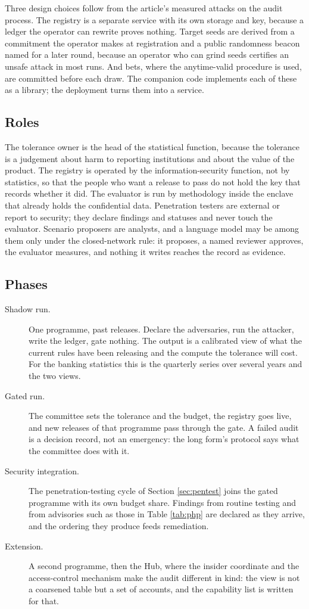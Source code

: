 \documentclass[11pt,a4paper]{article}
\begin{document}
Three design choices follow from the article's measured attacks on the audit process. The registry is a separate service with its own storage and key, because a ledger the operator can rewrite proves nothing. Target seeds are derived from a commitment the operator makes at registration and a public randomness beacon named for a later round, because an operator who can grind seeds certifies an unsafe attack in most runs. And bets, where the anytime-valid procedure is used, are committed before each draw. The companion code implements each of these as a library; the deployment turns them into a service.

\subsection{Roles}
The tolerance owner is the head of the statistical function, because the tolerance is a judgement about harm to reporting institutions and about the value of the product. The registry is operated by the information-security function, not by statistics, so that the people who want a release to pass do not hold the key that records whether it did. The evaluator is run by methodology inside the enclave that already holds the confidential data. Penetration testers are external or report to security; they declare findings and statuses and never touch the evaluator. Scenario proposers are analysts, and a language model may be among them only under the closed-network rule: it proposes, a named reviewer approves, the evaluator measures, and nothing it writes reaches the record as evidence.

\subsection{Phases}
\begin{description}
\item[Shadow run.] One programme, past releases. Declare the adversaries, run the attacker, write the ledger, gate nothing. The output is a calibrated view of what the current rules have been releasing and the compute the tolerance will cost. For the banking statistics this is the quarterly series over several years and the two views.
\item[Gated run.] The committee sets the tolerance and the budget, the registry goes live, and new releases of that programme pass through the gate. A failed audit is a decision record, not an emergency: the long form's protocol says what the committee does with it.
\item[Security integration.] The penetration-testing cycle of Section \ref{sec:pentest} joins the gated programme with its own budget share. Findings from routine testing and from advisories such as those in Table \ref{tab:php} are declared as they arrive, and the ordering they produce feeds remediation.
\item[Extension.] A second programme, then the Hub, where the insider coordinate and the access-control mechanism make the audit different in kind: the view is not a coarsened table but a set of accounts, and the capability list is written for that.
\end{description}
\end{document}
